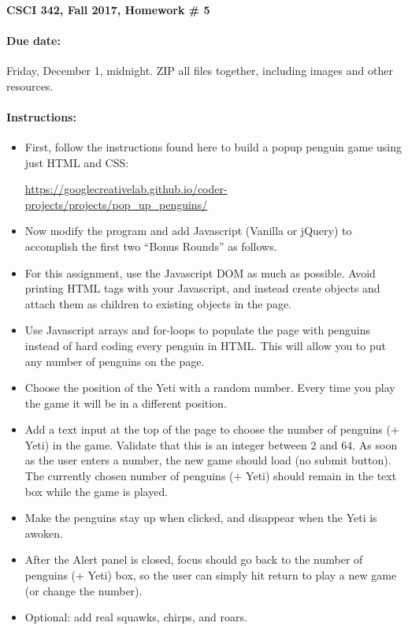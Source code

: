 \documentclass{article}
\newcommand{\myitem}{\paragraph}
\begin{document}
\myitem{CSCI 342, Fall 2017, Homework \# 5}

\myitem{Due date:}  Friday, December 1, midnight.  ZIP all files
together, including images and other resources.

\myitem{Instructions:}

\begin{itemize}
\item
First, follow the instructions found here to build a popup penguin game
using just HTML and CSS:

\centerline{\url{https://googlecreativelab.github.io/coder-projects/projects/pop_up_penguins/}}

\item Now modify the program and add Javascript (Vanilla or jQuery)
  to accomplish the first two ``Bonus Rounds'' as follows.

\item For this assignment, use the Javascript DOM as much as possible.
  Avoid printing HTML tags with your Javascript, and instead create
  objects and attach them as children to existing objects in the page.

\item Use Javascript arrays and for-loops to populate the page with
  penguins instead of hard coding every penguin in HTML.  This will
  allow you to put any number of penguins on the page.

\item Choose the position of the Yeti with a random number.  Every
  time you play the game it will be in a different position.
  
\item Add a text input at the top of the page to choose the number of
  penguins (+ Yeti) in the game.  Validate that this is an integer between 2
  and 64.  As soon as the user enters a number, the new game should
  load (no submit button).  The currently chosen number of penguins (+
  Yeti)  should remain in the text box while the game is played.

\item Make the penguins stay up when clicked, and disappear when the
  Yeti is awoken.

\item After the Alert panel is closed, focus should go back to the
  number of penguins (+ Yeti) box, so the user can simply hit return
  to play a new game (or change the number).

\item Optional:  add real squawks, chirps, and roars.  

\end{itemize}
\end{document}
